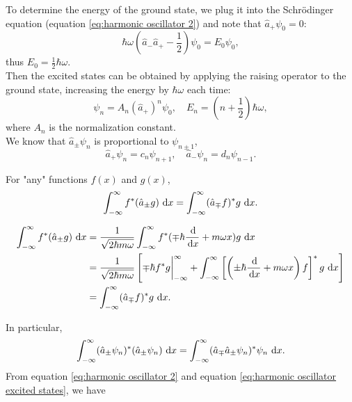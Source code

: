 \documentclass[en, oneside]{vivi}
\begin{document}
To determine the energy of the ground state, we plug it into the Schrödinger equation (equation \eqref{eq:harmonic oscillator 2}) and note that $\hat a_+ \psi_0 = 0$:
\begin{equation}
    \hbar \omega \left( \hat a_- \hat a_+ - \frac{1}{2} \right) \psi_0 = E_0 \psi_0,
\end{equation}
thus $E_0 = \frac{1}{2} \hbar \omega$.\\
Then the excited states can be obtained by applying the raising operator to the ground state, increasing the energy by $\hbar \omega$ each time:
\begin{equation} \label{eq:harmonic oscillator excited states}
    \psi_n = A_n (\hat a_+)^n \psi_0, \quad E_n = \left( n + \frac{1}{2} \right) \hbar \omega,
\end{equation}
where $A_n$ is the normalization constant.\\
We know that $\hat a_\pm \psi_n$ is proportional to $\psi_{n \pm 1}$,
\begin{equation}
    \hat a_+ \psi_n = c_n \psi_{n + 1}, \quad \hat a_- \psi_n = d_n \psi_{n - 1}.
\end{equation}
\begin{thm}
    For "any" functions $f(x)$ and $g(x)$, 
    \begin{equation}
        \int_{-\infty} ^\infty f ^* (\hat a_\pm g) \dif x = \int_{-\infty} ^\infty (\hat a_\mp f) ^* g \dif x.
    \end{equation}
\end{thm}
\begin{pf}
    \begin{align*}
        \int_{-\infty} ^\infty f ^* (\hat a_\pm g) \dif x &= \frac{1}{\sqrt{2\hbar m \omega}} \int_{-\infty} ^\infty f ^* (\mp \hbar \frac{\dif}{\dif x} + m \omega x) g \dif x\\
        &= \frac{1}{\sqrt{2\hbar m \omega}} \left[ \mp \hbar f ^* g \bigg|_{-\infty} ^\infty + \int_{-\infty} ^\infty \left[\left(\pm \hbar \frac{\dif}{\dif x} + m \omega x\right) f\right] ^* g \dif x \right]\\
        &= \int_{-\infty} ^\infty (\hat a_\mp f) ^* g \dif x.
    \end{align*}
\end{pf}
In particular,
\begin{equation}
    \int_{-\infty} ^\infty (\hat a_\pm \psi_n) ^* (\hat a_\pm \psi_n) \dif x = \int_{-\infty} ^\infty (\hat a_\mp \hat a_\pm \psi_n) ^* \psi_n \dif x.
\end{equation}
From equation \eqref{eq:harmonic oscillator 2} and equation \eqref{eq:harmonic oscillator excited states}, we have
\end{document}
